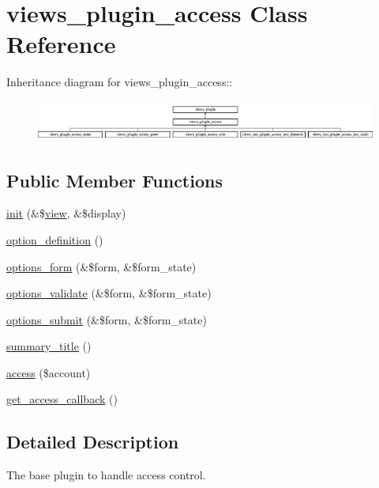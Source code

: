 \hypertarget{classviews__plugin__access}{
\section{views\_\-plugin\_\-access Class Reference}
\label{classviews__plugin__access}
}
Inheritance diagram for views\_\-plugin\_\-access::\begin{figure}[H]
\begin{center}
\leavevmode
\includegraphics[height=1.36585cm]{classviews__plugin__access}
\end{center}
\end{figure}
\subsection*{Public Member Functions}
\begin{DoxyCompactItemize}
\item 
\hyperlink{classviews__plugin__access_a1b295cea820f403d1e361e7de4e3800e}{init} (\&\$\hyperlink{classview}{view}, \&\$display)
\item 
\hyperlink{classviews__plugin__access_a3d52dc2603a2991a46a3c212a04097d2}{option\_\-definition} ()
\item 
\hyperlink{classviews__plugin__access_a530865442ea42db5e720e6c49f3d16f2}{options\_\-form} (\&\$form, \&\$form\_\-state)
\item 
\hyperlink{classviews__plugin__access_a1ac0bea409be6ef8d7eb4bfafcf760c6}{options\_\-validate} (\&\$form, \&\$form\_\-state)
\item 
\hyperlink{classviews__plugin__access_ad0610dfaa0e225c5d2cd85c7a13287fd}{options\_\-submit} (\&\$form, \&\$form\_\-state)
\item 
\hyperlink{classviews__plugin__access_ade500a95e599deffa417f8cbdd67bbf4}{summary\_\-title} ()
\item 
\hyperlink{classviews__plugin__access_ad24d38c1b1a1bd7527b2b96a2103cede}{access} (\$account)
\item 
\hyperlink{classviews__plugin__access_ad4038a32fccc6a662a74f437d0bf6a23}{get\_\-access\_\-callback} ()
\end{DoxyCompactItemize}


\subsection{Detailed Description}
The base plugin to handle access control. 

